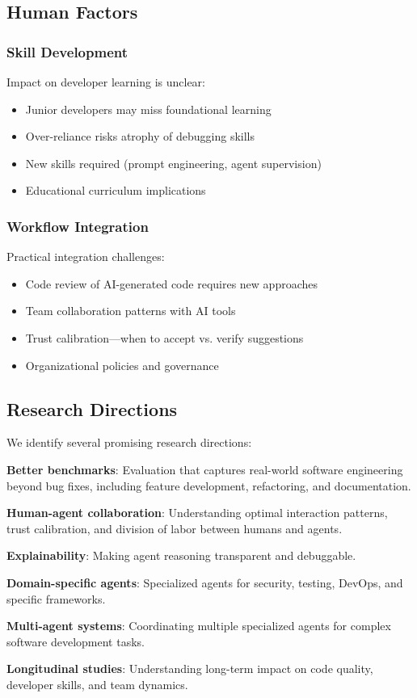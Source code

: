 \subsection{Human Factors}

\subsubsection{Skill Development}

Impact on developer learning is unclear:
\begin{itemize}
    \item Junior developers may miss foundational learning
    \item Over-reliance risks atrophy of debugging skills
    \item New skills required (prompt engineering, agent supervision)
    \item Educational curriculum implications
\end{itemize}

\subsubsection{Workflow Integration}

Practical integration challenges:
\begin{itemize}
    \item Code review of AI-generated code requires new approaches
    \item Team collaboration patterns with AI tools
    \item Trust calibration---when to accept vs. verify suggestions
    \item Organizational policies and governance
\end{itemize}

\subsection{Research Directions}

We identify several promising research directions:

\textbf{Better benchmarks}: Evaluation that captures real-world software engineering beyond bug fixes, including feature development, refactoring, and documentation.

\textbf{Human-agent collaboration}: Understanding optimal interaction patterns, trust calibration, and division of labor between humans and agents.

\textbf{Explainability}: Making agent reasoning transparent and debuggable.

\textbf{Domain-specific agents}: Specialized agents for security, testing, DevOps, and specific frameworks.

\textbf{Multi-agent systems}: Coordinating multiple specialized agents for complex software development tasks.

\textbf{Longitudinal studies}: Understanding long-term impact on code quality, developer skills, and team dynamics.
